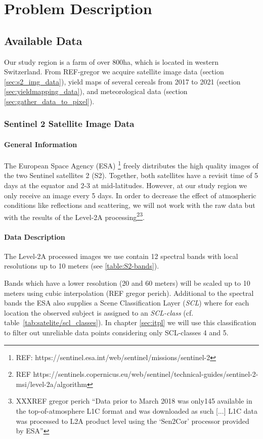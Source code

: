 \chapter{Problem Description}

\section{Available Data}
	{
		Our study region is a farm of over 800ha, which is located in western Switzerland. From REF-gregor we acquire satellite image data (section \ref{sec:s2_img_data}), yield maps of several cereals from 2017 to 2021 (section \ref{sec:yieldmapping_data}), and meteorological data (section \ref{sec:gather_data_to_pixel}).
	}

	\subsection{Sentinel 2 Satellite Image Data}{
		\label{sec:s2_img_data}
		\subsubsection*{General Information}{
			The European Space Agency (ESA) \footnote{REF: https://sentinel.esa.int/web/sentinel/missions/sentinel-2} freely distributes the high quality images of the two Sentinel satellites 2 (S2). Together, both satellites have a revisit time of 5 days at the equator and 2-3 at mid-latitudes. However, at our study region we only receive an image every 5 days.
			In order to decrease the effect of atmospheric conditions like reflections and scattering, we will not work with the raw data but with the results of the Level-2A processing\footnote{REF https://sentinels.copernicus.eu/web/sentinel/technical-guides/sentinel-2-msi/level-2a/algorithm}\footnote{XXXREF gregor perich ``Data prior to March 2018 was only145
			available in the top-of-atmosphere L1C format and was downloaded as such [...] L1C data was processed to L2A product level using the `Sen2Cor' processor provided by ESA''}. 
		}

		\subsubsection*{Data Description}{
			The Level-2A processed images we use contain 12 spectral bands with local resolutions up to 10 meters (see \ref{table:S2-bands}).   
			
			Bands which have a lower resolution (20 and 60 meters) will be scaled up to 10 meters using cubic interpolation (REF gregor perich).
			Additional to the spectral bands the ESA also supplies a Scene Classification Layer (\textit{SCL}) where for each location the observed subject is assigned to an \textit{SCL-class} (cf. table~\ref{tab:satelite/scl_classes}). In chapter \ref{sec:itpl}  we will use this classification to filter out unreliable data points considering only SCL-classes 4 and 5.  
			
}}

